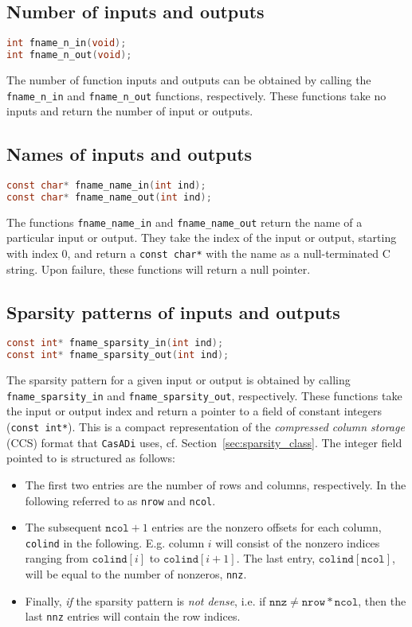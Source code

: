 \documentclass[a4paper,12pt]{book}
\newcommand{\CasADi}{\texttt{CasADi}\xspace}
\begin{document}
\subsection*{Number of inputs and outputs}
\begin{lstlisting}[language=C]
int fname_n_in(void);
int fname_n_out(void);
\end{lstlisting}

The number of function inputs and outputs can be obtained by calling the
\verb|fname_n_in| and \verb|fname_n_out| functions, respectively. These functions
take no inputs and return the number of input or outputs.

\subsection*{Names of inputs and outputs}
\begin{lstlisting}[language=C]
const char* fname_name_in(int ind);
const char* fname_name_out(int ind);
\end{lstlisting}

The functions \verb|fname_name_in| and \verb|fname_name_out| return the name
of a particular input or output. They take the index of the input or output,
starting with index 0, and return a \verb|const char*| with the name as a
null-terminated C string. Upon failure, these functions will return a null
pointer.

\subsection*{Sparsity patterns of inputs and outputs}
\begin{lstlisting}[language=C]
const int* fname_sparsity_in(int ind);
const int* fname_sparsity_out(int ind);
\end{lstlisting}

The sparsity pattern for a given input or output is obtained by calling
\verb|fname_sparsity_in| and \verb|fname_sparsity_out|, respectively.
These functions take the input or output index and return a pointer to a field
of constant integers (\verb|const int*|). This is a compact representation
of the \emph{compressed column storage} (CCS) format that \CasADi uses,
cf. Section~\ref{sec:sparsity_class}.
The integer field pointed to is structured as follows:

\begin{itemize}
  \item The first two entries are the number of rows and columns, respectively.
  In the following referred to as \texttt{nrow} and \texttt{ncol}.
  \item The subsequent $\texttt{ncol}+1$ entries are the nonzero offsets
  for each column, \texttt{colind} in the following. E.g. column $i$ will consist
  of the nonzero indices ranging from $\texttt{colind}[i]$ to $\texttt{colind}[i+1]$.
  The last entry, $\texttt{colind}[\texttt{ncol}]$, will be equal to the number
  of nonzeros, \texttt{nnz}.
  \item Finally, \emph{if} the sparsity pattern is \emph{not dense}, i.e. if
  $\texttt{nnz} \ne \texttt{nrow}*\texttt{ncol}$, then the last \texttt{nnz}
  entries will contain the row indices.
\end{itemize}
\end{document}
